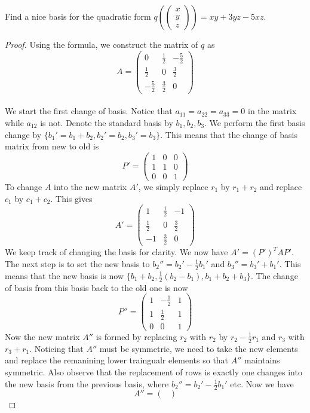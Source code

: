 \documentclass[a4paper]{article}
\begin{document}
\begin{eg}{}{} Find a nice basis for the quadratic form $q\left(\begin{pmatrix}x\\y\\z\end{pmatrix}\right)=xy+3yz-5xz$. 
\begin{proof}
Using the formula, we construct the matrix of $q$ as $$A=\begin{pmatrix}
0 & \frac{1}{2} & -\frac{5}{2}\\
\frac{1}{2} & 0 & \frac{3}{2}\\
-\frac{5}{2} & \frac{3}{2} & 0
\end{pmatrix}$$ ~\\
We start the first change of basis. Notice that $a_{11}=a_{22}=a_{33}=0$ in the matrix while $a_{12}$ is not. Denote the standard basis by $b_1,b_2,b_3$. We perform the first basis change by $\{b_1'=b_1+b_2,b_2'=b_2,b_3'=b_3\}$. This means that the change of basis matrix from new to old is $$P'=\begin{pmatrix}
1 & 0 & 0\\
1 & 1 & 0\\
0 & 0 & 1
\end{pmatrix}$$
To change $A$ into the new matrix $A'$, we simply replace $r_1$ by $r_1+r_2$ and replace $c_1$ by $c_1+c_2$. This gives $$A'=\begin{pmatrix}
1 & \frac{1}{2} & -1\\
\frac{1}{2} & 0 & \frac{3}{2}\\
-1 & \frac{3}{2} & 0
\end{pmatrix}$$
We keep track of changing the basis for clarity. We now have $A'=(P')^TAP'$. \\
The next step is to set the new basis to $b_2''=b_2'-\frac{1}{2}b_1'$ and $b_3''=b_3'+b_1'$. This means that the new basis is now $\{b_1+b_2,\frac{1}{2}(b_2-b_1),b_1+b_2+b_3\}$. The change of basis from this basis back to the old one is now $$P''=\begin{pmatrix}
1 & -\frac{1}{2} & 1\\
1 & \frac{1}{2} & 1\\
0 & 0 & 1
\end{pmatrix}$$ Now the new matrix $A''$ is formed by replacing $r_2$ with $r_2$ by $r_2-\frac{1}{2}r_1$ and $r_3$ with $r_3+r_1$. Noticing that $A''$ must be symmetric, we need to take the new elements and replace the remanining lower traingualr elements so that $A''$ maintains symmetric. Also observe that the replacement of rows is exactly one changes into the new basis from the previous basis, where $b_2''=b_2'-\frac{1}{2}b_1'$ etc. Now we have $$A''=\begin{pmatrix}

\end{pmatrix}$$
\end{proof}
\end{eg}
\end{document}
